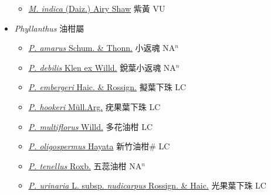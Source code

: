 \begin{itemize}
  \begin{itemize}
        \item[] \href{http://www.theplantlist.org/tpl1.1/search?q=Margaritaria+indica}{\textit{M. indica} (Daiz.) Airy Shaw}   紫黃 VU
  \end{itemize}
 \item[] \textit{Phyllanthus} 油柑屬
                    
  \begin{itemize}
        \item[] \href{http://www.theplantlist.org/tpl1.1/search?q=Phyllanthus+amarus}{\textit{P. amarus} Schum. \& Thonn.}   小返魂 NA$^n$
        \item[] \href{http://www.theplantlist.org/tpl1.1/search?q=Phyllanthus+debilis}{\textit{P. debilis} Klen ex Willd.}   銳葉小返魂 NA$^n$
        \item[] \href{http://www.theplantlist.org/tpl1.1/search?q=Phyllanthus+embergeri}{\textit{P. embergeri} Haic. \& Rossign.}   擬葉下珠 LC
        \item[] \href{http://www.theplantlist.org/tpl1.1/search?q=Phyllanthus+hookeri}{\textit{P. hookeri} Müll.Arg.}   疣果葉下珠 LC
        \item[] \href{http://www.theplantlist.org/tpl1.1/search?q=Phyllanthus+multiflorus}{\textit{P. multiflorus} Willd.}   多花油柑 LC
        \item[] \href{http://www.theplantlist.org/tpl1.1/search?q=Phyllanthus+oligospermus}{\textit{P. oligospermus} Hayata}   新竹油柑\# LC
        \item[] \href{http://www.theplantlist.org/tpl1.1/search?q=Phyllanthus+tenellus}{\textit{P. tenellus} Roxb.}   五蕊油柑 NA$^n$
        \item[] \href{http://www.theplantlist.org/tpl1.1/search?q=Phyllanthus+urinaria+subsp.+nudicarpus}{\textit{P. urinaria} L. subsp. \textit{nudicarpus} Rossign. \& Haic.}   光果葉下珠 LC

\end{itemize}
\end{itemize}
